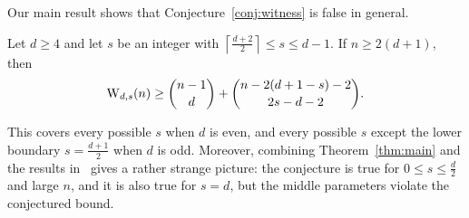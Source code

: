 Our main result shows that Conjecture~\ref{conj:witness} is false in general.

\begin{theorem}\label{thm:main}
Let \(d\ge4\) and let \(s\) be an integer with
\(\left\lceil \frac{d+2}{2}\right\rceil\le s\le d-1.\) If \(n\ge2(d+1)\), then
\[
\operatorname{W}_{d,s}(n)\ge\binom{n-1}{d}+\binom{n-2(d+1-s)-2}{2s-d-2}.
\]
\end{theorem}
This covers every possible \(s\) when \(d\) is even, and every possible \(s\) except the lower boundary \(s=\frac{d+1}{2}\) when \(d\) is odd. Moreover, combining Theorem~\ref{thm:main} and the results in~\cite{2025CombProof,2026Chao,1961EKR} gives a rather strange picture: the conjecture is true for \(0\le s\le \frac{d}{2}\) and large \(n\), and it is also true for \(s=d\), but the middle parameters violate the conjectured bound.
